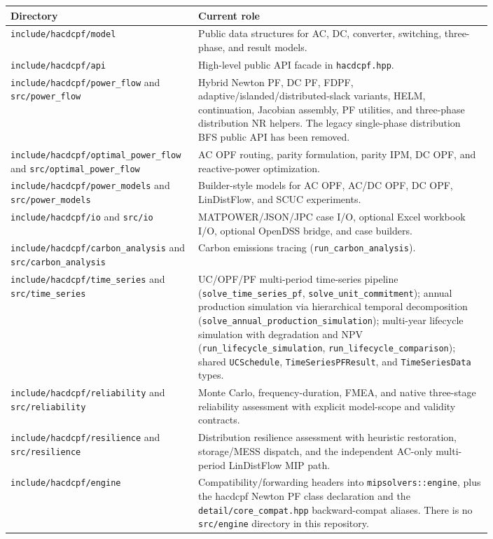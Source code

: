 \begin{longtable}{L{0.22\linewidth}L{0.58\linewidth}}
\toprule
Directory & Current role \\
\midrule
\endhead
\texttt{include/hacdcpf/model} & Public data structures for AC, DC, converter, switching, three-phase, and result models. \\
\texttt{include/hacdcpf/api} & High-level public API facade in \texttt{hacdcpf.hpp}. \\
\texttt{include/hacdcpf/power\_flow} and \texttt{src/power\_flow} & Hybrid Newton PF, DC PF, FDPF, adaptive/islanded/distributed-slack variants, HELM, continuation, Jacobian assembly, PF utilities, and three-phase distribution NR helpers.  The legacy single-phase distribution BFS public API has been removed. \\
\texttt{include/hacdcpf/optimal\_power\_flow} and \texttt{src/optimal\_power\_flow} & AC OPF routing, parity formulation, parity IPM, DC OPF, and reactive-power optimization. \\
\texttt{include/hacdcpf/power\_models} and \texttt{src/power\_models} & Builder-style models for AC OPF, AC/DC OPF, DC OPF, LinDistFlow, and SCUC experiments. \\
\texttt{include/hacdcpf/io} and \texttt{src/io} & MATPOWER/JSON/JPC case I/O, optional Excel workbook I/O, optional OpenDSS bridge, and case builders. \\
\texttt{include/hacdcpf/carbon\_analysis} and \texttt{src/carbon\_analysis} & Carbon emissions tracing (\texttt{run\_carbon\_analysis}). \\
\texttt{include/hacdcpf/time\_series} and \texttt{src/time\_series} & UC/OPF/PF multi-period time-series pipeline (\texttt{solve\_time\_series\_pf}, \texttt{solve\_unit\_commitment}); annual production simulation via hierarchical temporal decomposition (\texttt{solve\_annual\_production\_simulation}); multi-year lifecycle simulation with degradation and NPV (\texttt{run\_lifecycle\_simulation}, \texttt{run\_lifecycle\_comparison}); shared \texttt{UCSchedule}, \texttt{TimeSeriesPFResult}, and \texttt{TimeSeriesData} types. \\
\texttt{include/hacdcpf/reliability} and \texttt{src/reliability} & Monte Carlo, frequency-duration, FMEA, and native three-stage reliability assessment with explicit model-scope and validity contracts. \\
\texttt{include/hacdcpf/resilience} and \texttt{src/resilience} & Distribution resilience assessment with heuristic restoration, storage/MESS dispatch, and the independent AC-only multi-period LinDistFlow MIP path. \\
\texttt{include/hacdcpf/engine} & Compatibility/forwarding headers into \texttt{mipsolvers::engine}, plus the hacdcpf Newton PF class declaration and the \texttt{detail/core\_compat.hpp} backward-compat aliases.  There is no \texttt{src/engine} directory in this repository. \\
\bottomrule
\end{longtable}

